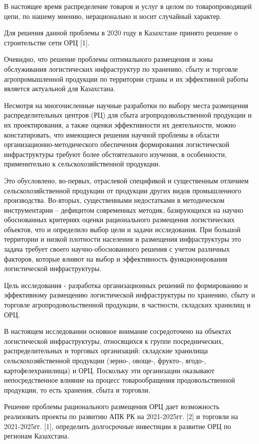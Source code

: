 В настоящее время распределение товаров и услуг в целом по
товаропроводящей цепи, по нашему мнению, нерационально и носит случайный
характер.

Для решения данной проблемы в 2020 году в Казахстане принято решение о
строительстве сети ОРЦ {[}1{]}.

Очевидно, что решение проблемы оптимального размещения и зоны
обслуживания логистических инфраструктур по хранению, сбыту и торговле
агропромышленной продукции по территории страны и их эффективной работы
является актуальной для Казахстана.

Несмотря на многочисленные научные разработки по выбору места размещения
распределительных центров (РЦ) для сбыта агропродовольственной продукции
и их проектирования, а также оценки эффективности их деятельности, можно
констатировать, что имеющиеся решения научной проблемы в области
организационно-методического обеспечения формирования логистической
инфраструктуры требуют более обстоятельного изучения, в особенности,
применительно к сельскохозяйственной продукции.

Это обусловлено, во-первых, отраслевой спецификой и существенным
отличием сельскохозяйственной продукции от продукции других видов
промышленного производства. Во-вторых, существенными недостатками в
методическом инструментарии -- дефицитом современных методик,
базирующихся на научно обоснованных критериях оценки рационального
размещения логистических объектов, что и определило выбор цели и задачи
исследования. При большой территории и низкой плотности населения и
размещения инфраструктуры это задача требует своего научно-обоснованного
решения с учетом различных факторов, которые влияют на выбор и
эффективность функционирования логистической инфраструктуры.

Цель исследования - разработка организационных решений по
формированию и эффективному размещению логистической инфраструктуры по
хранению, сбыту и торговле агропродовольственной продукции, в частности,
складских хранилищ и ОРЦ.

В настоящем исследовании основное внимание сосредоточено на объектах
логистической инфраструктуры, относящихся к группе посреднических,
распределительных и торговых организаций: складские хранилища
сельскохозяйственной продукции (зерно-, овоще-, фрукто-, ягодо-,
картофелехранилища) и ОРЦ. Поскольку эти организации оказывают
непосредственное влияние на процесс товарообращения продовольственной
продукции, то есть хранения, сбыта и торговли.

Решение проблемы рационального размещения ОРЦ дает возможность
реализовать проекты по развитию АПК РК на 2021-2025гг. {[}2{]} и
торговли на 2021-2025гг. {[}1{]}, определить долгосрочные инвестиции в
развитие ОРЦ по регионам Казахстана.

